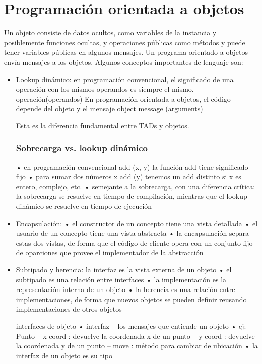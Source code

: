 \documentclass[10pt,a4paper]{report}
\begin{document}
\section{Programación orientada a objetos}
\par Un objeto consiste de datos ocultos, como variables de la instancia y 
posiblemente funciones ocultas, y operaciones públicas como métodos y puede 
tener variables públicas en algunos mensajes. Un programa orientado a objetos 
envía mensajes a los objetos. Algunos conceptos importantes de lenguaje son:
\begin{itemize}
\item Lookup dinámico: en programación convencional, el significado de una 
operación con los mismos operandos es siempre el mismo.
  operación(operandos) 
En programación orientada a objetos, el código depende del objeto y el mensaje
object message (arguments) 
\par Esta es la diferencia fundamental entre TADs y objetos.

\subsubsection{Sobrecarga vs. lookup dinámico}
•  en programación convencional add (x, y)  la función add tiene significado fijo
•  para sumar dos números x  add (y) 
tenemos un add distinto si x es entero, complejo,
etc.
•  semejante a la sobrecarga, con una diferencia crítica: la sobrecarga se resuelve en 
tiempo de compilación, mientras que el lookup dinámico se resuelve en tiempo de 
ejecución
    \item Encapsulación: •  el constructor de un concepto tiene una vista detallada
•  el usuario de un concepto tiene una vista abstracta
•  la encapsulación separa estas dos vistas, de forma que el código de cliente opera con un conjunto fijo de oparciones que provee el implementador de la abstracción
    
    \item Subtipado y herencia: la interfaz es la vista externa de un objeto
•  el subtipado es una relación entre interfaces
•  la implementación es la representación interna de un objeto
•  la herencia es una relación entre implementaciones, de forma que nuevos objetos se pueden definir reusando implementaciones de otros objetos


interfaces de objeto •  interfaz
– los mensajes que entiende un objeto •  ej: Punto 
– x-coord : devuelve la coordenada x de un punto
– y-coord : devuelve la coordenada y de un punto
– move : método para cambiar de ubicación •  la interfaz de un objeto es su tipo



\end{itemize}
\end{document}
